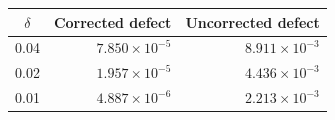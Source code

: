 \begin{tabular}{c r r}
\hline
$\delta$ & Corrected defect & Uncorrected defect \\
\hline
0.04 & $7.850\times10^{-5}$ & $8.911\times10^{-3}$ \\
0.02 & $1.957\times10^{-5}$ & $4.436\times10^{-3}$ \\
0.01 & $4.887\times10^{-6}$ & $2.213\times10^{-3}$ \\
\hline
\end{tabular}
